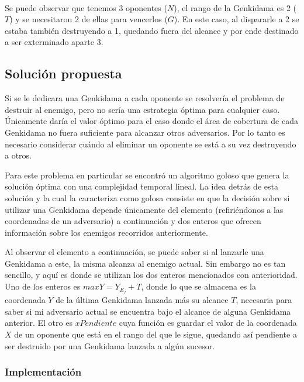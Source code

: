 	~

	Se puede observar que tenemos 3 oponentes ($N$), el rango de la
	Genkidama es 2 ($T$) y se necesitaron 2 de ellas para vencerlos ($G$). En este caso, al
	dispararle a 2 se estaba también destruyendo a 1, quedando fuera del alcance
	y por ende destinado a ser exterminado aparte 3.

    \subsection{Solución propuesta}

	Si se le dedicara una Genkidama a cada oponente se resolvería el problema de
	destruir al enemigo, pero no sería una estrategia óptima para cualquier
	caso. Únicamente daría el valor óptimo para el caso donde el área de cobertura de cada
	Genkidama no fuera suficiente para alcanzar otros adversarios. Por lo tanto
	es necesario considerar cuándo al eliminar un oponente se está a su vez
	destruyendo a otros.

	Para este problema en particular se encontró un algoritmo goloso que genera
	la solución óptima con una complejidad temporal lineal. La idea detrás de
	esta solución y la cual la caracteriza como golosa consiste en que la
	decisión sobre si utilizar una Genkidama depende únicamente del
	elemento (refiriéndonos a las coordenadas de un adversario) a continuación y dos
	enteros que ofrecen información sobre los enemigos recorridos anteriormente.

	Al observar el elemento a continuación, se puede saber si al lanzarle una
	Genkidama a este, la misma alcanza al enemigo actual. Sin embargo no
	es tan sencillo, y aquí es donde se utilizan los dos enteros mencionados con
	anterioridad. Uno de los enteros es $maxY = Y_{E_j} + T$, donde lo que se
	almacena es la coordenada $Y$ de la última Genkidama lanzada más su alcance
	$T$, necesaria para saber si mi adversario actual se encuentra bajo el
	alcance de alguna Genkidama anterior. El otro es $xPendiente$ cuya función
	es guardar el valor de la coordenada $X$ de un oponente que está en el
	rango del que le sigue, quedando así pendiente a ser destruido por una
	Genkidama lanzada a algún sucesor.

	\subsubsection{Implementación}\label{ej2_imp}

